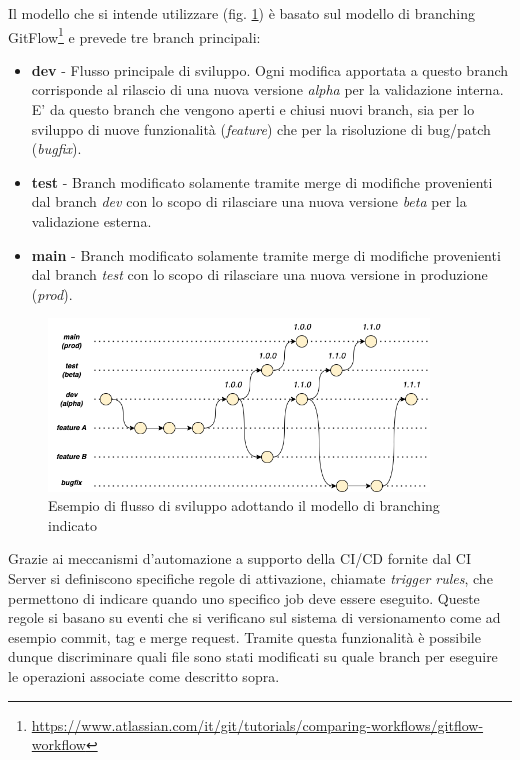 Il modello che si intende utilizzare (fig. \ref{branching}) è basato sul modello di branching GitFlow\footnote{\href{https://www.atlassian.com/it/git/tutorials/comparing-workflows/gitflow-workflow}{https://www.atlassian.com/it/git/tutorials/comparing-workflows/gitflow-workflow}} e prevede tre branch principali:

\begin{itemize}
    \item \textbf{dev} - Flusso principale di sviluppo. Ogni modifica apportata a questo branch corrisponde al rilascio di una nuova versione \textit{alpha} per la validazione interna. E' da questo branch che vengono aperti e chiusi nuovi branch, sia per lo sviluppo di nuove funzionalità (\textit{feature}) che per la risoluzione di bug/patch (\textit{bugfix}).
    
    \item \textbf{test} - Branch modificato solamente tramite merge di modifiche provenienti dal branch \textit{dev} con lo scopo di rilasciare una nuova versione \textit{beta} per la validazione esterna.
    
    \item \textbf{main} - Branch modificato solamente tramite merge di modifiche provenienti dal branch \textit{test} con lo scopo di rilasciare una nuova versione in produzione (\textit{prod}).
\end{itemize}

\begin{figure}[H]
    \centering
    \includegraphics[width=0.9\textwidth]{img/branching-model.png}
    \caption{Esempio di flusso di sviluppo adottando il modello di branching indicato}
    \label{branching}
\end{figure}

Grazie ai meccanismi d'automazione a supporto della CI/CD fornite dal CI Server si definiscono specifiche regole di attivazione, 
chiamate \textit{trigger rules}, 
che permettono di indicare quando uno specifico job deve essere eseguito.
Queste regole si basano su eventi che si verificano sul sistema di versionamento come ad esempio commit, 
tag e merge request. 
Tramite questa funzionalità è possibile dunque discriminare quali file sono stati modificati su quale branch per eseguire le operazioni associate come descritto sopra.

